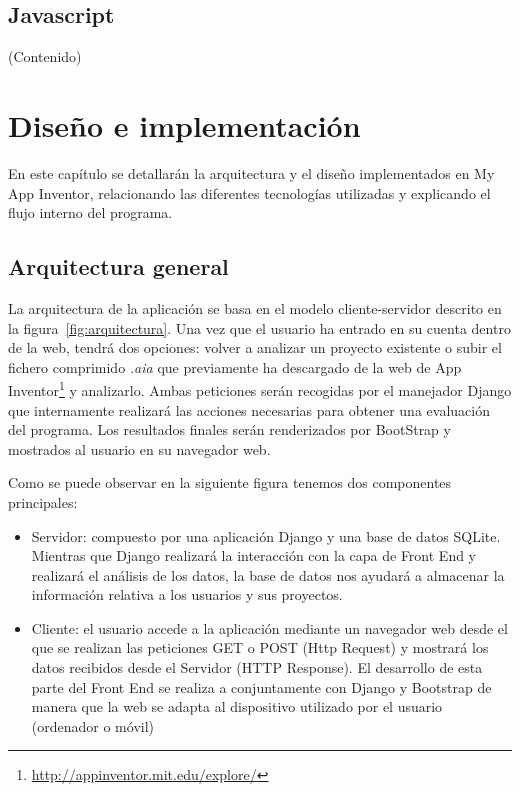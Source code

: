 \documentclass[a4paper, 12pt]{book}
\begin{document}
\section{Javascript} 
\label{sec:seccion10}
(Contenido)

\cleardoublepage
\chapter{Diseño e implementación}
En este capítulo se detallarán la arquitectura y el diseño implementados en My App Inventor, relacionando las diferentes tecnologías utilizadas y explicando el flujo interno del programa.  
\section{Arquitectura general} 
\label{sec:arquitectura}
La arquitectura de la aplicación se basa en el modelo cliente-servidor descrito en la figura~\ref{fig:arquitectura}. Una vez que el usuario ha entrado en su cuenta dentro de la web, tendrá dos opciones: volver a analizar un proyecto existente o subir el fichero comprimido \textit{.aia} que previamente ha descargado de la web de App Inventor\footnote{\url{http://appinventor.mit.edu/explore/}} y analizarlo. Ambas peticiones serán recogidas por el manejador Django que internamente realizará las acciones necesarias para obtener una evaluación del programa. Los resultados finales serán renderizados por BootStrap y mostrados al usuario en su navegador web. 

Como se puede observar en la siguiente figura tenemos dos componentes principales:
\begin{itemize}
		\item Servidor: compuesto por una aplicación Django y una base de datos SQLite. Mientras que Django realizará la interacción con la capa de Front End y realizará el análisis de los datos, la base de datos nos ayudará a almacenar la información relativa a los usuarios y sus proyectos.   
		\item Cliente: el usuario accede a la aplicación mediante un navegador web desde el que se realizan las peticiones GET o POST (Http Request) y mostrará los datos recibidos desde el Servidor (HTTP Response). El desarrollo de esta parte del Front End se realiza a conjuntamente con Django y Bootstrap de manera que la web se adapta al dispositivo utilizado por el usuario (ordenador o móvil) 
\end{itemize}
\end{document}
